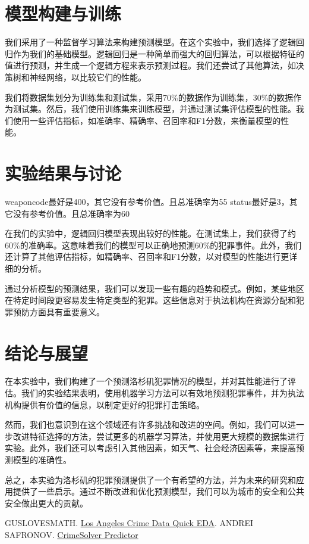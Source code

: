 \documentclass{article}
\begin{document}
\section{模型构建与训练}
我们采用了一种监督学习算法来构建预测模型。在这个实验中，我们选择了逻辑回归作为我们的基础模型。逻辑回归是一种简单而强大的回归算法，可以根据特征的值进行预测，并生成一个逻辑方程来表示预测过程。我们还尝试了其他算法，如决策树和神经网络，以比较它们的性能。

我们将数据集划分为训练集和测试集，采用70\%的数据作为训练集，30\%的数据作为测试集。然后，我们使用训练集来训练模型，并通过测试集评估模型的性能。我们使用一些评估指标，如准确率、精确率、召回率和F1分数，来衡量模型的性能。

\section{实验结果与讨论}

weapon\textunderscore{}code最好是400，其它没有参考价值。且总准确率为55
status最好是3，其它没有参考价值。且总准确率为60

在我们的实验中，逻辑回归模型表现出较好的性能。在测试集上，我们获得了约60\%的准确率。这意味着我们的模型可以正确地预测60\%的犯罪事件。此外，我们还计算了其他评估指标，如精确率、召回率和F1分数，以对模型的性能进行更详细的分析。

通过分析模型的预测结果，我们可以发现一些有趣的趋势和模式。例如，某些地区在特定时间段更容易发生特定类型的犯罪。这些信息对于执法机构在资源分配和犯罪预防方面具有重要意义。

\section{结论与展望}
在本实验中，我们构建了一个预测洛杉矶犯罪情况的模型，并对其性能进行了评估。我们的实验结果表明，使用机器学习方法可以有效地预测犯罪事件，并为执法机构提供有价值的信息，以制定更好的犯罪打击策略。

然而，我们也意识到在这个领域还有许多挑战和改进的空间。例如，我们可以进一步改进特征选择的方法，尝试更多的机器学习算法，并使用更大规模的数据集进行实验。此外，我们还可以考虑引入其他因素，如天气、社会经济因素等，来提高预测模型的准确性。

总之，本实验为洛杉矶的犯罪预测提供了一个有希望的方法，并为未来的研究和应用提供了一些启示。通过不断改进和优化预测模型，我们可以为城市的安全和公共安全做出更大的贡献。

\begin{thebibliography}{99}
     GUSLOVESMATH. \href{https://www.kaggle.com/code/guslovesmath/los-angeles-crime-data-quick-eda}{Los Angeles Crime Data Quick EDA}.
     ANDREI SAFRONOV. \href{https://www.kaggle.com/code/safronov00/crimesolver-predictor#2.-Clean-Data}{CrimeSolver Predictor}
\end{thebibliography}
\end{document}
